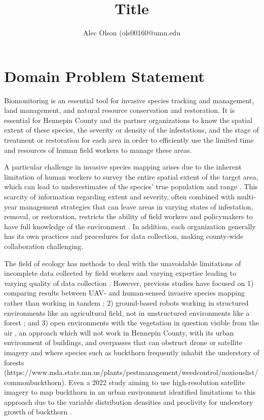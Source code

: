 \documentclass{article}
\begin{document}
\title{Title}

\author{Alec Olson (ols00160@umn.edu}


\maketitle

\section{Domain Problem Statement}
Biomonitoring is an essential tool for invasive species tracking and management, land management, and natural resource conservation and restoration. It is essential for Hennepin County and its partner organizations to know the spatial extent of these species, the severity or density of the infestations, and the stage of treatment or restoration for each area in order to efficiently use the limited time and resources of human field workers to manage these areas.

A particular challenge in invasive species mapping arises due to the inherent limitation of human workers to survey the entire spatial extent of the target area, which can lead to underestimates of the species’ true population and range \cite{https://doi.org/10.1890/0012-9658}. This scarcity of information regarding extent and severity, often combined with multi-year management strategies that can leave areas in varying states of infestation, removal, or restoration, restricts the ability of field workers and policymakers to have full knowledge of the environment \cite{when-to-monitor-or-control}. In addition, each organization generally has its own practices and procedures for data collection, making county-wide collaboration challenging.

The field of ecology has methods to deal with the unavoidable limitations of incomplete data collected by field workers \cite{https://doi.org/10.1890/0012-9658} and varying expertise leading to varying quality of data collection \cite{5694101}. However, previous studies have focused on 1) comparing results between UAV- and human-sensed invasive species mapping rather than working in tandem \cite{new-tools-old-problems} \cite{PMID:40775501}; 2) ground-based robots working in structured environments like an agricultural field, not in unstructured environments like a forest \cite{7989612}; and 3) open environments with the vegetation in question visible from the air \cite{new-tools-old-problems} \cite{PMID:40775501}, an approach which will not work in Hennepin County, with its urban environment of buildings, and overpasses that can obstruct drone or satellite imagery and where species such as buckthorn frequently inhabit the understory of forests (https://www.mda.state.mn.us/plants/pestmanagement/weedcontrol/noxiouslist/commonbuckthorn). Even a 2022 study aiming to use high-resolution satellite imagery to map buckthorn in an urban environment identified limitations to this approach due to the variable distribution densities and proclivity for understory growth of buckthorn \cite{Nininahazwe02102023}.
\end{document}
